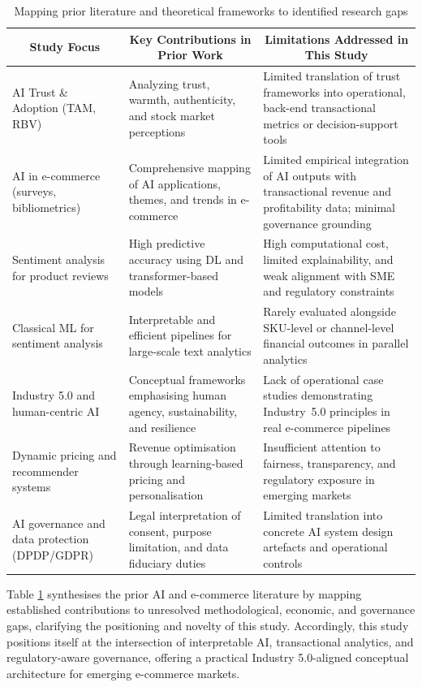 \documentclass[authoryear,review,3p,times,12pt]{elsarticle}
\begin{document}
\begin{table}
\centering
\renewcommand{\arraystretch}{1.15}
\caption{Mapping prior literature and theoretical frameworks to identified research gaps}
\label{tab:mapping_literature}
\begin{tabular}{p{4cm} p{5cm} p{6cm}}
\hline
\multicolumn{1}{c}{\textbf{Study Focus}} &
  \multicolumn{1}{c}{\textbf{Key   Contributions in Prior Work}} &
  \multicolumn{1}{c}{\textbf{Limitations Addressed in This Study}} \\ \hline
AI Trust \& Adoption (TAM, RBV) &
  Analyzing trust, warmth, authenticity, and stock market perceptions &
  Limited translation of trust frameworks into operational, back-end transactional metrics or decision-support tools \\
AI in e-commerce   (surveys, bibliometrics) &
  Comprehensive   mapping of AI applications, themes, and trends in e-commerce &
  Limited   empirical integration of AI outputs with transactional revenue and   profitability data; minimal governance grounding \\
Sentiment   analysis for product reviews &
  High predictive   accuracy using DL and transformer-based models &
  High   computational cost, limited explainability, and weak alignment with SME and   regulatory constraints \\
Classical ML for   sentiment analysis &
  Interpretable   and efficient pipelines for large-scale text analytics &
  Rarely   evaluated alongside SKU-level or channel-level financial outcomes in parallel analytics \\
Industry 5.0 and   human-centric AI &
  Conceptual   frameworks emphasising human agency, sustainability, and resilience &
  Lack of   operational case studies demonstrating Industry~5.0 principles in real   e-commerce pipelines \\
Dynamic pricing   and recommender systems &
  Revenue   optimisation through learning-based pricing and personalisation &
  Insufficient   attention to fairness, transparency, and regulatory exposure in emerging   markets \\
AI governance   and data protection (DPDP/GDPR) &
  Legal   interpretation of consent, purpose limitation, and data fiduciary duties &
  Limited   translation into concrete AI system design artefacts and operational controls \\ \hline
\end{tabular}
\end{table}

Table \ref{tab:mapping_literature} synthesises the prior AI and e-commerce literature by mapping established contributions to unresolved methodological, economic, and governance gaps, clarifying the positioning and novelty of this study. Accordingly, this study positions itself at the intersection of interpretable AI, transactional analytics, and regulatory-aware governance, offering a practical Industry 5.0-aligned conceptual architecture for emerging e-commerce markets.
\end{document}
